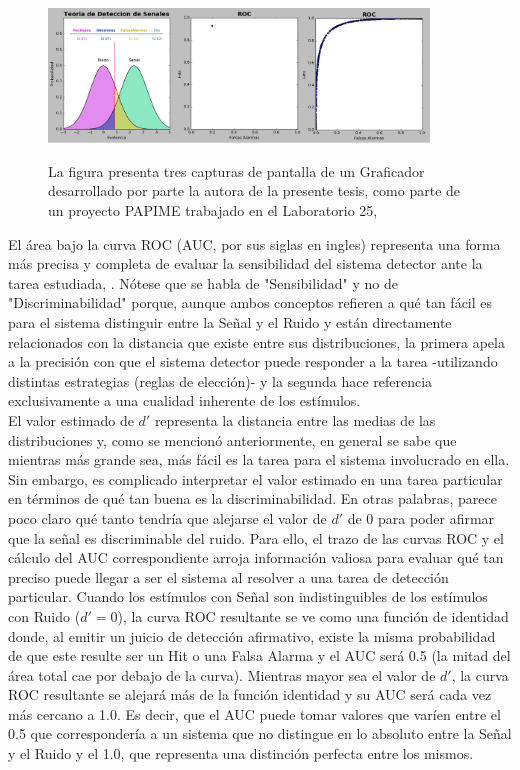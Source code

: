 \begin{figure}[th]
\centering
\includegraphics[width=0.90\textwidth]{Figures/Graficador_ROC12}\\
\caption[Ejemplo de Curva ROC]{La figura presenta tres capturas de pantalla de un Graficador desarrollado por parte la autora de la presente tesis, como parte de un proyecto PAPIME trabajado en el Laboratorio 25, \parencite{PAPIME}}
\label{fig:Graf_ROC}
\end{figure}

El área bajo la curva ROC (AUC, por sus siglas en ingles) representa una forma más precisa y completa de evaluar la sensibilidad del sistema detector ante la tarea estudiada, \parencite{McNicol5}. Nótese que se habla de "Sensibilidad" y no de "Discriminabilidad" porque, aunque ambos conceptos refieren a qué tan fácil es para el sistema distinguir entre la Señal y el Ruido y están directamente relacionados con la distancia que existe entre sus distribuciones, la primera apela a la precisión con que el sistema detector puede responder a la tarea -utilizando distintas estrategias (reglas de elección)- y la segunda hace referencia exclusivamente a una cualidad inherente de los estímulos.\\

El valor estimado de $d'$ representa la distancia entre las medias de las distribuciones y, como se mencionó anteriormente, en general se sabe que mientras más grande sea, más fácil es la tarea para el sistema involucrado en ella. Sin embargo, es complicado interpretar el valor estimado en una tarea particular en términos de qué tan buena es la discriminabilidad. En otras palabras, parece poco claro qué tanto tendría que alejarse el valor de $d'$ de 0 para poder afirmar que la señal es discriminable del ruido. Para ello, el trazo de las curvas ROC y el cálculo del AUC correspondiente arroja información valiosa para evaluar qué tan preciso puede llegar a ser el sistema al resolver a una tarea de detección particular. Cuando los estímulos con Señal son indistinguibles de los estímulos con Ruido ($d' = 0$), la curva ROC resultante se ve como una función de identidad donde, al emitir un juicio de detección afirmativo, existe la misma probabilidad de que este resulte ser un Hit o una Falsa Alarma y el AUC será 0.5 (la mitad del área total cae por debajo de la curva). Mientras mayor sea el valor de $d'$, la curva ROC resultante se alejará más de la función identidad y su AUC será cada vez más cercano a 1.0. Es decir, que el AUC puede tomar valores que varíen entre el 0.5 que correspondería a un sistema que no distingue en lo absoluto entre la Señal y el Ruido y el 1.0, que representa una distinción perfecta entre los mismos.\\

